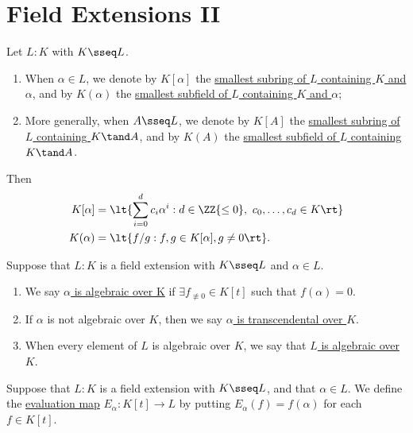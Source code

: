 \documentclass[a4paper]{article}
\begin{document}
\section{Field Extensions II}
\begin{tdefinition}
  Let \( L:K \) with \( K\sseq L \).
  \begin{enumerate}[label=(\roman*)]
    \item When \( \alpha\in L \), we denote by \( K[\alpha] \) the \ul{smallest subring of \( L \) containing \( K \) and \( \alpha \)}, and by \( K(\alpha) \) the \ul{smallest subfield of \( L \) containing \( K \) and \( \alpha \)};
    \item More generally, when \( A\sseq L \), we denote by \( K[A] \) the \ul{smallest subring of \( L \) containing \( K \tand A \)}, and by \( K(A) \) the \ul{smallest subfield of \( L \) containing \( K \tand A \)}.
  \end{enumerate}
  Then \begin{align*}
    K[\alpha] &= \lt\{ \sum_{i=0}^{d}c_i\alpha^i : d\in \ZZ{\leq 0},\ c_0,\ldots,c_d\in K \rt\} \\
    K(\alpha) &= \lt\{ f/g : f,g\in K[\alpha], g\neq 0 \rt\}.
  \end{align*}
\end{tdefinition}

\begin{tdefinition}
  Suppose that \( L: K \) is a field extension with \( K\sseq L \) and \( \alpha\in L \).
  \begin{enumerate}[label=(\roman*)]
    \item We say \ul{\( \alpha \) is algebraic over K} if \( \exists f_{\not\equiv 0} \in K[t] \) such that \( f(\alpha)=0 \).
    \item If \( \alpha \) is not algebraic over \( K \), then we say \ul{\( \alpha \) is transcendental over \( K \)}.
    \item When every element of \( L \) is algebraic over \( K \), we say that \ul{\( L \) is algebraic over \( K \)}.
  \end{enumerate}
\end{tdefinition}

\begin{tdefinition}
  Suppose that \( L: K \) is a field extension with \( K \sseq L \), and that \( \alpha\in L \).
  We define the \ul{evaluation map} \( E_\alpha : K[t] \to L \) by putting \( E_\alpha(f) = f(\alpha) \) for each \( f \in K[t] \).
\end{tdefinition}
\end{document}
